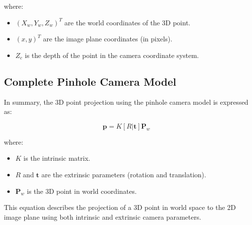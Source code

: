 where:
\begin{itemize}
	\item \((X_w, Y_w, Z_w)^T\) are the world coordinates of the 3D point.
	\item \((x, y)^T\) are the image plane coordinates (in pixels).
	\item \(Z_c\) is the depth of the point in the camera coordinate system.
\end{itemize}

\subsection{Complete Pinhole Camera Model}

In summary, the 3D point projection using the pinhole camera model is expressed as:

\[
\mathbf{p} = K [R | \mathbf{t}] \mathbf{P}_w
\]

where:
\begin{itemize}
	\item \(K\) is the intrinsic matrix.
	\item \(R\) and \(\mathbf{t}\) are the extrinsic parameters (rotation and translation).
	\item \(\mathbf{P}_w\) is the 3D point in world coordinates.
\end{itemize}

This equation describes the projection of a 3D point in world space to the 2D image plane using both intrinsic and extrinsic camera parameters.
